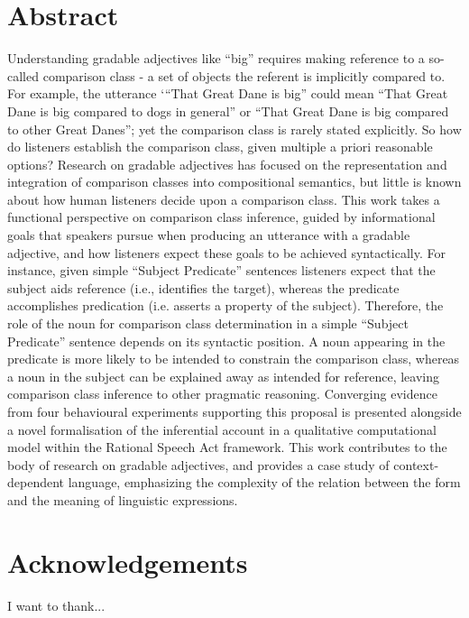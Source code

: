 \documentclass[12pt, twoside]{report}
\begin{document}


\chapter*{Abstract}
Understanding gradable adjectives like “big” requires making reference to a so-called comparison class - a set of objects the referent is implicitly compared to. For example, the utterance ‘“That Great Dane is big” could mean “That Great Dane is big compared to dogs in general” or “That Great Dane is big compared to other Great Danes”; yet the comparison class is rarely stated explicitly. So how do listeners establish the comparison class, given multiple a priori reasonable options?
Research on gradable adjectives has focused on the representation and integration of comparison classes into compositional semantics, but little is known about how human listeners decide upon a comparison class. 
This work takes a functional perspective on comparison class inference, guided by informational goals that speakers pursue when producing an utterance with a gradable adjective, and how listeners expect these goals to be achieved syntactically. For instance, given simple “Subject Predicate” sentences listeners expect that the subject aids reference (i.e., identifies the target), whereas the predicate accomplishes predication (i.e. asserts a property of the subject). Therefore, the role of the noun for comparison class determination  in a simple “Subject Predicate” sentence depends on its syntactic position. A noun appearing in the predicate is more likely to be intended to constrain the comparison class, whereas a noun in the subject can be explained away as intended for reference, leaving comparison class inference to other pragmatic reasoning. 
Converging evidence from four behavioural experiments supporting this proposal is presented alongside a novel formalisation of the inferential account in a qualitative computational model within the Rational Speech Act framework. This work contributes to the body of research on gradable adjectives, and provides a case study of  context-dependent language, emphasizing the complexity of the relation between the form and the meaning of linguistic expressions. 


\chapter*{Acknowledgements}
I want to thank...

\tableofcontents
\listoffigures
\listoftables
\end{document}
